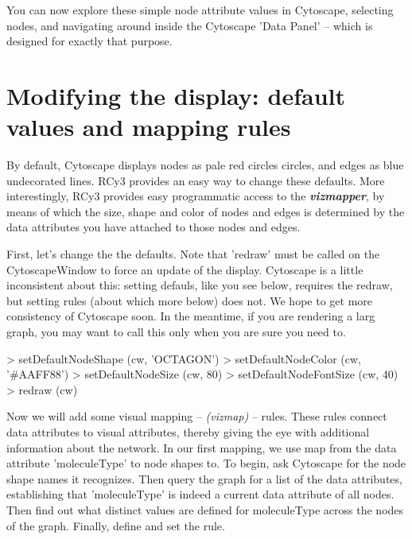 \documentclass[12pt]{article}
\begin{document}
You can now explore these simple node attribute values in Cytoscape, selecting nodes, and navigating around inside the Cytoscape 'Data Panel' -- which is designed for exactly that purpose.


\section{Modifying the display:  default values and mapping rules}

By default, Cytoscape displays nodes as pale red circles circles, and edges as blue undecorated lines.  RCy3
provides an easy way to change these defaults.  More interestingly, RCy3 provides easy programmatic access to the
\emph{\textbf{vizmapper}}, by means of which the size, shape and color of nodes and edges is determined by the data attributes you have attached to those nodes and edges. 

First, let's change the the defaults.  Note that 'redraw' must be called on the CytoscapeWindow to force an update of
the display.  Cytoscape is a little inconsistent about this:  setting
defauls, like you see below, requires the redraw, but setting rules
(about which more below) does not.  We hope to get more consistency of
Cytoscape soon.  In the meantime, if you are rendering a larg graph, you may want to call this only when you are sure you need to.

\begin{Schunk}
\begin{Sinput}
>   setDefaultNodeShape (cw, 'OCTAGON')
>   setDefaultNodeColor (cw, '#AAFF88')
>   setDefaultNodeSize  (cw, 80)
>   setDefaultNodeFontSize (cw, 40)
>   redraw (cw)
\end{Sinput}
\end{Schunk}

Now we will add some visual mapping -- \emph {(vizmap)} -- rules.  These rules connect data attributes to visual attributes, thereby giving the eye with additional information about the network.  In our first mapping, we use map from the data attribute 'moleculeType' to node shapes to.  To begin, ask Cytoscape for the node shape names it recognizes.  Then query the graph for a list of the data attributes, establishing that 'moleculeType' is indeed a current data attribute of all nodes.  Then find out what distinct values are defined for moleculeType across the nodes of the graph.  Finally, define and set the rule.
\end{document}
